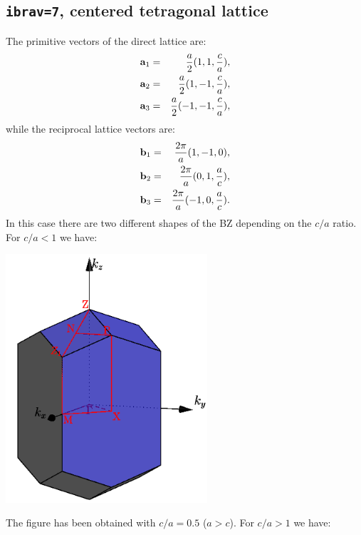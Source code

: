 \documentclass[12pt,a4paper]{article}
\begin{document}
\subsection{\texttt{ibrav=7}, centered tetragonal lattice}
The primitive vectors of the direct lattice are:
\begin{eqnarray}
{\bf a}_1 &=& {a \over 2} (1, 1, {c\over a}), \nonumber \\
{\bf a}_2 &=& {a \over 2} (1, -1, {c\over a}), \nonumber \\
{\bf a}_3 &=& {a \over 2} (-1, -1, {c\over a}), \nonumber
\nonumber
\end{eqnarray}
while the reciprocal lattice vectors are:
\begin{eqnarray}
{\bf b}_1 &=& {2\pi \over a} (1, -1, 0), \nonumber \\
{\bf b}_2 &=& {2\pi \over a} (0, 1, {a\over c}), \nonumber \\
{\bf b}_3 &=& {2\pi \over a} (-1, 0, {a\over c}). \nonumber
\nonumber
\end{eqnarray}
In this case there are two different shapes of the BZ depending on the
$c/a$ ratio. For $c/a<1$ we have:
\begin{center}
\includegraphics[width=7.5cm,angle=0]{images/stc1.png}
\end{center}
The figure has been obtained with $c/a=0.5$ ($a>c$). For $c/a>1$ we have:
\end{document}
